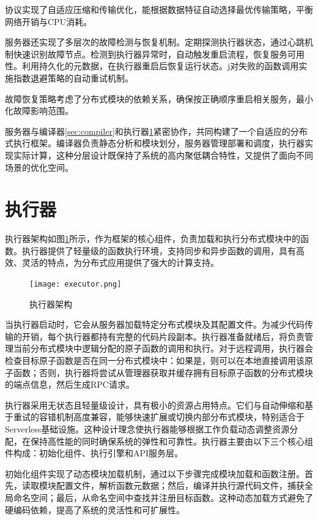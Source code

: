 协议实现了自适应压缩和传输优化，能根据数据特征自动选择最优传输策略，平衡网络开销与CPU消耗。

服务器还实现了多层次的故障检测与恢复机制。定期探测执行器状态，通过心跳机制快速识别故障节点。检测到执行器异常时，自动触发重启流程，恢复服务可用性。利用持久化的元数据，在执行器重启后恢复运行状态。j对失败的函数调用实施指数退避策略的自动重试机制。

故障恢复策略考虑了分布式模块的依赖关系，确保按正确顺序重启相关服务，最小化故障影响范围。

服务器与编译器\ref{sec:compiler}和执行器\ref{sec:executor}紧密协作，共同构建了一个自适应的分布式执行框架。编译器负责静态分析和模块划分，服务器管理部署和调度，执行器实现实际计算，这种分层设计既保持了系统的高内聚低耦合特性，又提供了面向不同场景的优化空间。

\section{执行器}
\label{sec:executor}
执行器架构如图\ref{fig:executor}所示，作为框架的核心组件，负责加载和执行分布式模块中的函数。执行器提供了轻量级的函数执行环境，支持同步和异步函数的调用，具有高效、灵活的特点，为分布式应用提供了强大的计算支持。

\begin{figure}[ht]
    \centering
    \texttt{[image: executor.png]}
    \caption{执行器架构}
    \label{fig:executor}
\end{figure}

当执行器启动时，它会从服务器加载特定分布式模块及其配置文件。为减少代码传输的开销，每个执行器都持有完整的代码片段副本。执行器准备就绪后，将负责管理当前分布式模块中逻辑分配的原子函数的调用和执行。对于远程调用，执行器会检查目标原子函数是否在同一分布式模块中：如果是，则可以在本地直接调用该原子函数；否则，执行器将尝试从管理器获取并缓存拥有目标原子函数的分布式模块的端点信息，然后生成RPC请求。

执行器采用无状态且轻量级设计，具有极小的资源占用特点。它们与自动伸缩和基于重试的容错机制高度兼容，能够快速扩展或切换内部分布式模块，特别适合于Serverless基础设施。这种设计理念使执行器能够根据工作负载动态调整资源分配，在保持高性能的同时确保系统的弹性和可靠性。执行器主要由以下三个核心组件构成：初始化组件、执行引擎和API服务层。

初始化组件实现了动态模块加载机制，通过以下步骤完成模块加载和函数注册。首先，读取模块配置文件，解析函数元数据；然后，编译并执行源代码文件，捕获全局命名空间；最后，从命名空间中查找并注册目标函数。这种动态加载方式避免了硬编码依赖，提高了系统的灵活性和可扩展性。

